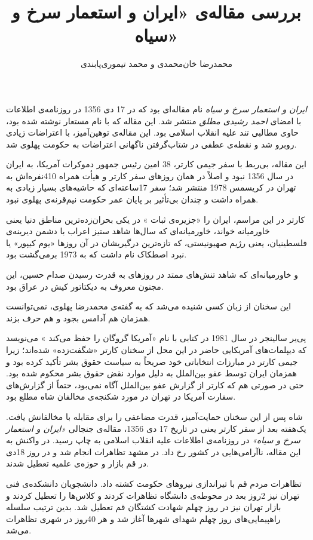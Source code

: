 \documentclass{article}
\author{محمدرضا خان‌محمدی و محمد تیموری‌پابندی}
\title{بررسی مقاله‌ی «ایران و استعمار سرخ و سیاه»}
\begin{document}
\maketitle
\textit{ایران و استعمار سرخ و سیاه}
نام مقاله‌ای بود که در 17 دی 1356 در روزنامه‌ی اطلاعات با امضای
\textit{احمد رشیدی مطلق}
منتشر شد. این مقاله که با نام مستعار نوشته شده بود، حاوی مطالبی تند علیه انقلاب اسلامی بود. این مقاله‌ی توهین‌آمیز، با اعتراضات زیادی روبرو شد و نقطه‌ی عطفی در شتاب‌گرفتن ناگهانی اعتراضات به حکومت پهلوی شد.
\par
این مقاله، بی‌ربط با سفر جیمی کارتر، 38 امین رئیس جمهور دموکرات آمریکا، به ایران در سال 1356 نبود و اصلاً در همان روزهای سفر کارتر و هیأت همراه 410نفره‌اش به تهران در کریسمس 1978 منتشر شد؛ سفر 17ساعته‌ای که حاشیه‌های بسیار زیادی به همراه داشت و چندان بی‌تأثیر بر پایان عمر حکومت نیم‌قرنه‌ی پهلوی نبود.
\par
کارتر در این مراسم، ایران را «جزیره‌ی ثبات
» در یکی بحران‌زده‌ترین مناطق دنیا یعنی خاورمیانه خواند، خاورمیانه‌ای که سال‌ها شاهد ستیز اعراب با دشمن دیرینه‌ی فلسطینیان، یعنی رژیم صهیونیستی، که تازه‌ترین درگیریشان در آن روز‌ها «یوم کیپور» یا نبرد اصطکاک نام داشت که به 1973 برمی‌گشت بود.
\par
و خاورمیانه‌ای که شاهد تنش‌های ممتد در روزهای به قدرت رسیدن صدام حسین، این مجنون معروف به دیکتاتور کیش در عراق بود.
\par
این سخنان از زبان کسی شنیده می‌شد که به گفته‌ی محمدرضا پهلوی، نمی‌توانست همزمان هم آدامس بجود و هم حرف بزند.
\par
پی‌یر سالینجر
در سال 1981 در کتابی با نام «آمریکا گروگان را حفظ می‌کند
» می‌نویسد که دیپلمات‌های آمریکایی حاضر در این محل از سخنان کارتر «شگفت‌زده» شده‌اند؛ زیرا جیمی کارتر در مبارزات انتخاباتی خود صریحاً به سیاست حقوق بشر تأکید کرده بود و همزمان ایران توسط عفو بین‌الملل به دلیل موارد نقض حقوق بشر محکوم شده بود. حتی در صورتی هم که کارتر از گزارش عفو بین‌الملل آگاه نمی‌بود، حتماً از گزارش‌های سفارت آمریکا در تهران در مورد شکنجه‌ی مخالفان شاه مطلع بود.
\par
شاه پس از این سخنان حمایت‌آمیز، قدرت مضاعفی را برای مقابله با مخالفانش یافت. یک‌هفته بعد از سفر کارتر یعنی در تاریخ 17 دی 1356، مقاله‌ی جنجالی \textit{«ایران و استعمار سرخ و سیاه»} در روزنامه‌ی اطلاعات علیه انقلاب اسلامی به چاپ رسید. در واکنش به این مقاله، ناآرامی‌هایی در کشور رخ داد. در مشهد تظاهرات انجام شد و در روز 18دی در قم بازار و حوزه‌ی علمیه تعطیل شدند.
\par
تظاهرات مردم قم با تیراندازی نیروهای حکومت کشته داد. دانشجویان دانشکده‌ی فنی تهران نیز 2روز بعد در محوطه‌ی دانشگاه تظاهرات کردند و کلاس‌ها را تعطیل کردند و بازار تهران نیز در روز چهلم شهادت کشتگان قم تعطیل شد. بدین ترتیب سلسله راهپیمایی‌های روز چهلم شهدای شهرها آغاز شد و هر 40روز در شهری تظاهرات می‌شد.
\end{document}

